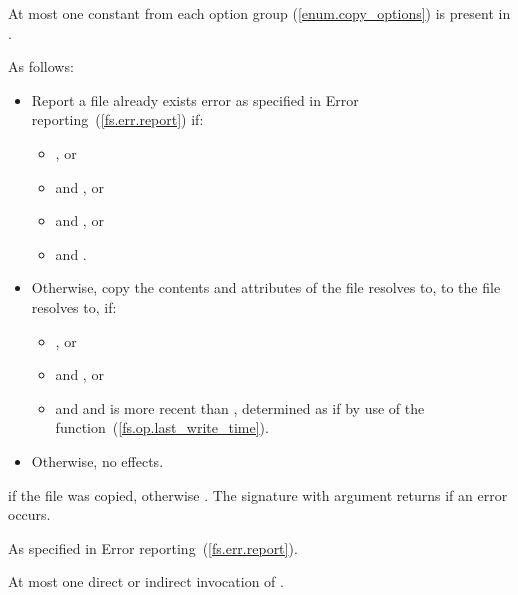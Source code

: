 \begin{itemdescr}
\pnum
\requires At most one constant from each 
  option group (\ref{enum.copy_options}) is present
  in .

\pnum
\effects
As follows:
\begin{itemize}
\item
Report a file already exists error as specified in
    Error reporting~(\ref{fs.err.report}) if:
\begin{itemize}
\item {}, or
\item {} and , or
\item {} and , or
\item {} and .
\end{itemize}

\item
Otherwise, copy the contents and attributes of the file 
    resolves to, to the file  resolves to, if:
\begin{itemize}
\item {}, or
\item {} and , or
\item {} and  and 
      is more recent than , determined as if by use of the  function~(\ref{fs.op.last_write_time}).
\end{itemize}

\item
Otherwise, no effects.
\end{itemize}

\pnum
\returns {} if the  file
  was copied, otherwise . The signature with argument  returns
   if an error occurs.

\pnum
\throws As specified in Error reporting~(\ref{fs.err.report}).

\pnum
\complexity At most one direct or indirect invocation of .
\end{itemdescr}

